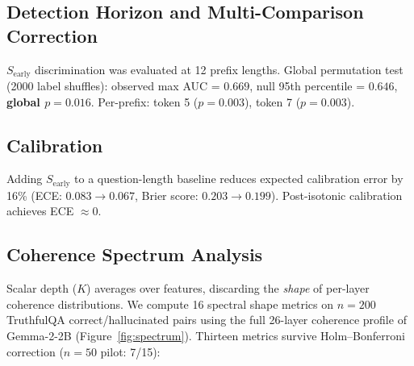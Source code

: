 \documentclass{article}
\begin{document}
\subsection{Detection Horizon and Multi-Comparison Correction}

$S_\text{early}$ discrimination was evaluated at 12 prefix lengths.
Global permutation test (2000 label shuffles): observed max AUC =
$0.669$, null 95th percentile = $0.646$, \textbf{global $p = 0.016$}.
Per-prefix: token 5 ($p = 0.003$), token 7 ($p = 0.003$).

\subsection{Calibration}

Adding $S_\text{early}$ to a question-length baseline reduces expected
calibration error by 16\% (ECE: $0.083 \rightarrow 0.067$, Brier
score: $0.203 \rightarrow 0.199$). Post-isotonic calibration achieves
ECE $\approx 0$.

\subsection{Coherence Spectrum Analysis}
\label{sec:spectrum}

Scalar depth ($K$) averages over features, discarding the
\textit{shape} of per-layer coherence distributions. We compute
16 spectral shape metrics on $n = 200$ TruthfulQA
correct/hallucinated pairs using the full 26-layer coherence
profile of Gemma-2-2B (Figure~\ref{fig:spectrum}). Thirteen metrics
survive Holm--Bonferroni correction ($n = 50$ pilot: 7/15):
\end{document}

